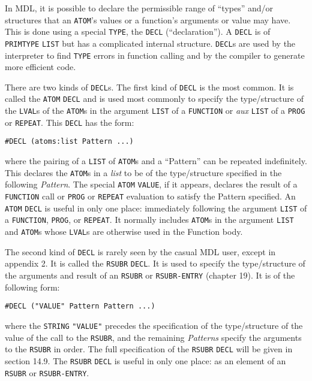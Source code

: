 \documentclass[a4paper,]{article}
\begin{document}
In MDL, it is possible to declare the permissible range of ``types'' and/or structures that an \texttt{ATOM}'s values or a
function's arguments or value may have. This is done using a special \texttt{TYPE}, the
\texttt{DECL} (``declaration''). A \texttt{DECL} is of \texttt{PRIMTYPE} \texttt{LIST} but has
a complicated internal structure. \texttt{DECL}s are used by the interpreter to find \texttt{TYPE} errors in function
calling and by the compiler to generate more efficient code.

There are two kinds of \texttt{DECL}s. The first kind of \texttt{DECL} is the most common. It is called the \texttt{ATOM}
\texttt{DECL} and is used most commonly to specify the type/structure of the \texttt{LVAL}s of the \texttt{ATOM}s in the
argument \texttt{LIST} of a \texttt{FUNCTION} or \emph{aux} \texttt{LIST} of a \texttt{PROG} or \texttt{REPEAT}. This
\texttt{DECL} has the form:

\begin{verbatim}
#DECL (atoms:list Pattern ...)
\end{verbatim}

where the pairing of a \texttt{LIST} of \texttt{ATOM}s and a ``Pattern'' can be repeated indefinitely. This declares the
\texttt{ATOM}s in a \emph{list} to be of the type/structure specified in the following \emph{Pattern}. The special
\texttt{ATOM} \texttt{VALUE}, if it appears, declares the result of a \texttt{FUNCTION} call
or \texttt{PROG} or \texttt{REPEAT} evaluation to satisfy the Pattern specified. An \texttt{ATOM} \texttt{DECL} is useful
in only one place: immediately following the argument \texttt{LIST} of a \texttt{FUNCTION}, \texttt{PROG}, or
\texttt{REPEAT}. It normally includes \texttt{ATOM}s in the argument \texttt{LIST} and \texttt{ATOM}s whose \texttt{LVAL}s
are otherwise used in the Function body.

The second kind of \texttt{DECL} is rarely seen by the casual MDL user, except in appendix 2. It is called the
\texttt{RSUBR} \texttt{DECL}. It is used to specify the type/structure of the arguments and result of an \texttt{RSUBR} or
\texttt{RSUBR-ENTRY} (chapter 19). It is of the following form:

\begin{verbatim}
#DECL ("VALUE" Pattern Pattern ...)
\end{verbatim}

where the \texttt{STRING} \texttt{"VALUE"} precedes the specification of the type/structure of the value of the call to the
\texttt{RSUBR}, and the remaining \emph{Patterns} specify the arguments to the \texttt{RSUBR} in order. The full
specification of the \texttt{RSUBR} \texttt{DECL} will be given in section 14.9. The \texttt{RSUBR} \texttt{DECL} is useful
in only one place: as an element of an \texttt{RSUBR} or \texttt{RSUBR-ENTRY}.
\end{document}
